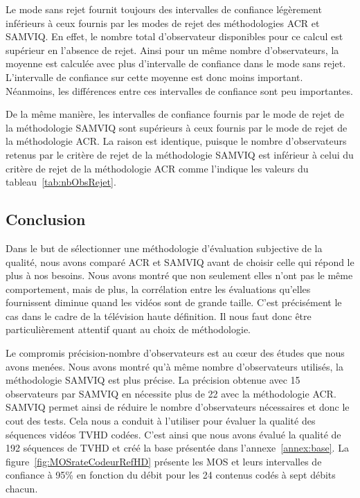Le mode sans rejet fournit toujours des intervalles de confiance légèrement inférieurs à ceux fournis par les modes de rejet des méthodologies ACR et SAMVIQ. En effet, le nombre total d'observateur disponibles pour ce calcul est supérieur en l'absence de rejet. Ainsi pour un même nombre d'observateurs, la moyenne est calculée avec plus d'intervalle de confiance dans le mode sans rejet. L'intervalle de confiance sur cette moyenne est donc moins important. Néanmoins, les différences entre ces intervalles de confiance sont peu importantes.

De la même manière, les intervalles de confiance fournis par le mode de rejet de la méthodologie SAMVIQ sont supérieurs à ceux fournis par le mode de rejet de la méthodologie ACR. La raison est identique, puisque le nombre d'observateurs retenus par le critère de rejet de la méthodologie SAMVIQ est inférieur à celui du critère de rejet de la méthodologie ACR comme l'indique les valeurs du tableau~\ref{tab:nbObsRejet}.


\subsection{Conclusion}
Dans le but de sélectionner une méthodologie d'évaluation subjective de la qualité, nous avons comparé ACR et SAMVIQ avant de choisir celle qui répond le plus à nos besoins. Nous avons montré que non seulement elles n'ont pas le même comportement, mais de plus, la corrélation entre les évaluations qu'elles fournissent diminue quand les vidéos sont de grande taille. C'est précisément le cas dans le cadre de la télévision haute définition. Il nous faut donc être particulièrement attentif quant au choix de méthodologie.

Le compromis précision-nombre d'observateurs est au c\oe ur des études que nous avons menées. Nous avons montré qu'à même nombre d'observateurs utilisés, la méthodologie SAMVIQ est plus précise. La précision obtenue avec 15 observateurs par SAMVIQ en nécessite plus de 22 avec la méthodologie ACR. SAMVIQ permet ainsi de réduire le nombre d'observateurs nécessaires et donc le cout des tests. Cela nous a conduit à l'utiliser pour évaluer la qualité des séquences vidéos TVHD codées. C'est ainsi que nous avons évalué la qualité de 192 séquences de TVHD et créé la base présentée dans l'annexe~\ref{annex:base}. La figure~\ref{fig:MOSrateCodeurRefHD} présente les MOS et leurs intervalles de confiance à 95\% en fonction du débit pour les 24 contenus codés à sept débits chacun.


